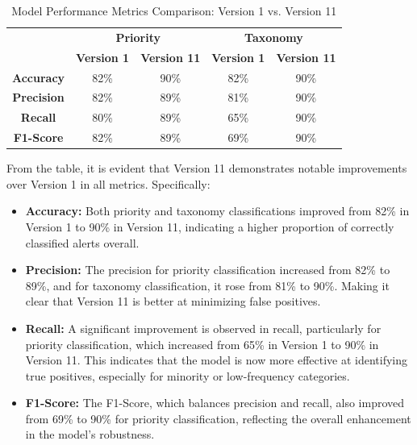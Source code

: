\clearpage

\begin{table}[h!]
    \centering
    \caption{Model Performance Metrics Comparison: Version 1 vs. Version 11}
    \label{tab:results_comparative}
    \begin{tabular}{@{}ccccc@{}}
        \toprule
        \multirow{2}{0em}{} & \multicolumn{2}{c}{\textbf{Priority}} & \multicolumn{2}{c}{\textbf{Taxonomy}} \\
        & \textbf{Version 1} & \textbf{Version 11} & \textbf{Version 1} & \textbf{Version 11} \\
        \hline
        \textbf{Accuracy} & 82\% & 90\% & 82\% & 90\% \\
        \textbf{Precision} & 82\% & 89\% & 81\% & 90\% \\
        \textbf{Recall} & 80\% & 89\% & 65\% & 90\% \\
        \textbf{F1-Score} & 82\% & 89\% & 69\% & 90\% \\
        \bottomrule
    \end{tabular}
\end{table}

From the table, it is evident that Version 11 demonstrates notable improvements over Version 1 in all metrics. Specifically:

\begin{itemize}
    \item \textbf{Accuracy:} Both priority and taxonomy classifications improved from 82\% in Version 1 to 90\% in Version 11, indicating a higher proportion of correctly classified alerts overall.
    \item \textbf{Precision:} The precision for priority classification increased from 82\% to 89\%, and for taxonomy classification, it rose from 81\% to 90\%. Making it clear that Version 11 is better at minimizing false positives.
    \item \textbf{Recall:} A significant improvement is observed in recall, particularly for priority classification, which increased from 65\% in Version 1 to 90\% in Version 11. This indicates that the model is now more effective at identifying true positives, especially for minority or low-frequency categories.
    \item \textbf{F1-Score:} The F1-Score, which balances precision and recall, also improved from 69\% to 90\% for priority classification, reflecting the overall enhancement in the model's robustness.
\end{itemize}

